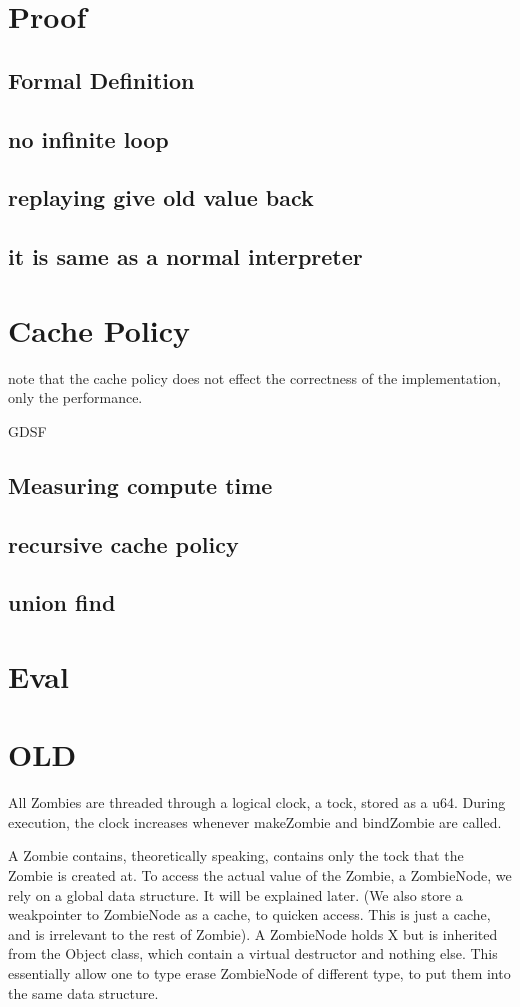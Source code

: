 \documentclass[acmsmall]{acmart}
\begin{document}
	\section{Proof}
	\subsection{Formal Definition}
	\subsection{no infinite loop}
	\subsection{replaying give old value back}
	\subsection{it is same as a normal interpreter}
	\section{Cache Policy}
	note that the cache policy does not effect the correctness of the implementation, only the performance.
	
	GDSF
	\subsection{Measuring compute time}
	\subsection{recursive cache policy}
	\subsection{union find}
	\section{Eval}
	
	\section{OLD}
	All Zombies are threaded through a logical clock, a tock, stored as a u64.
	During execution, the clock increases whenever makeZombie and bindZombie are called.
	
	A Zombie contains, theoretically speaking, contains only the tock that the Zombie is created at.
	To access the actual value of the Zombie, a ZombieNode, we rely on a global data structure.
	It will be explained later.
	(We also store a weakpointer to ZombieNode as a cache, to quicken access. This is just a cache, and is irrelevant to the rest of Zombie).
	A ZombieNode holds X but is inherited from the Object class, which contain a virtual destructor and nothing else. This essentially allow one to type erase ZombieNode of different type, to put them into the same data structure.
	
\end{document}
